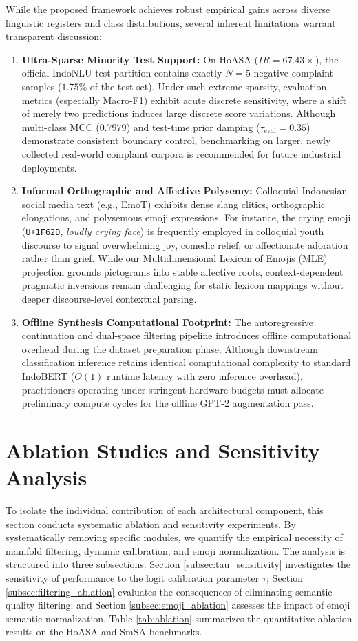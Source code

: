 \documentclass{ieeeaccess}
\begin{document}
While the proposed framework achieves robust empirical gains across diverse linguistic registers and class distributions, several inherent limitations warrant transparent discussion:
\begin{enumerate}
    \item \textbf{Ultra-Sparse Minority Test Support:} On HoASA ($IR=67.43\times$), the official IndoNLU test partition contains exactly $N=5$ negative complaint samples ($1.75\%$ of the test set). Under such extreme sparsity, evaluation metrics (especially Macro-F1) exhibit acute discrete sensitivity, where a shift of merely two predictions induces large discrete score variations. Although multi-class MCC ($0.7979$) and test-time prior damping ($\tau_{\text{eval}} = 0.35$) demonstrate consistent boundary control, benchmarking on larger, newly collected real-world complaint corpora is recommended for future industrial deployments.
    \item \textbf{Informal Orthographic and Affective Polysemy:} Colloquial Indonesian social media text (e.g., EmoT) exhibits dense slang clitics, orthographic elongations, and polysemous emoji expressions. For instance, the crying emoji (\texttt{U+1F62D}, \textit{loudly crying face}) is frequently employed in colloquial youth discourse to signal overwhelming joy, comedic relief, or affectionate adoration rather than grief. While our Multidimensional Lexicon of Emojis (MLE) projection grounds pictograms into stable affective roots, context-dependent pragmatic inversions remain challenging for static lexicon mappings without deeper discourse-level contextual parsing.
    \item \textbf{Offline Synthesis Computational Footprint:} The autoregressive continuation and dual-space filtering pipeline introduces offline computational overhead during the dataset preparation phase. Although downstream classification inference retains identical computational complexity to standard IndoBERT ($O(1)$ runtime latency with zero inference overhead), practitioners operating under stringent hardware budgets must allocate preliminary compute cycles for the offline GPT-2 augmentation pass.
\end{enumerate}

\section{Ablation Studies and Sensitivity Analysis}
\label{sec:ablation}

To isolate the individual contribution of each architectural component, this section conducts systematic ablation and sensitivity experiments. By systematically removing specific modules, we quantify the empirical necessity of manifold filtering, dynamic calibration, and emoji normalization. The analysis is structured into three subsections: Section \ref{subsec:tau_sensitivity} investigates the sensitivity of performance to the logit calibration parameter $\tau$; Section \ref{subsec:filtering_ablation} evaluates the consequences of eliminating semantic quality filtering; and Section \ref{subsec:emoji_ablation} assesses the impact of emoji semantic normalization. Table \ref{tab:ablation} summarizes the quantitative ablation results on the HoASA and SmSA benchmarks.
\end{document}

